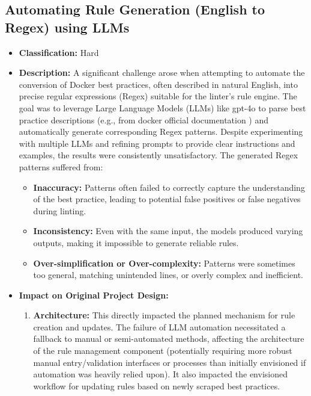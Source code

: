 \subsection{Automating Rule Generation (English to Regex) using LLMs}
\label{subsec:llm_regex_difficulty} %
\begin{itemize}
    \item \textbf{Classification:} Hard
    \item \textbf{Description:} A significant challenge arose when attempting to automate the conversion of Docker best practices, often described in natural English, into precise regular expressions (Regex) suitable for the linter's rule engine. The goal was to leverage Large Language Models (LLMs) like gpt-4o to parse best practice descriptions (e.g., from docker official documentation ) and automatically generate corresponding Regex patterns. Despite experimenting with multiple LLMs and refining prompts to provide clear instructions and examples, the results were consistently unsatisfactory. The generated Regex patterns suffered from:
        \begin{itemize}
            \item \textbf{Inaccuracy:} Patterns often failed to correctly capture the understanding of the best practice, leading to potential false positives or false negatives during linting.
            \item \textbf{Inconsistency:} Even with the same input, the models produced varying outputs, making it impossible to generate reliable rules.
            \item \textbf{Over-simplification or Over-complexity:} Patterns were sometimes too general, matching unintended lines, or overly complex and inefficient.
        \end{itemize}
    \item \textbf{Impact on Original Project Design:}
        \begin{enumerate}
            \item \textbf{Architecture:} This directly impacted the planned mechanism for rule creation and updates. The failure of LLM automation necessitated a fallback to manual or semi-automated methods, affecting the architecture of the rule management component (potentially requiring more robust manual entry/validation interfaces or processes than initially envisioned if automation was heavily relied upon). It also impacted the envisioned workflow for updating rules based on newly scraped best practices.

\end{enumerate}
\end{itemize}
